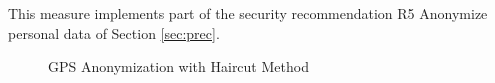 This measure implements part of the security recommendation R5
Anonymize personal data of Section \ref{sec:prec}.

\begin{figure}
  \centering
  \quad
  \caption{GPS Anonymization with Haircut Method}
  \label{fig:haircut}
\end{figure}
